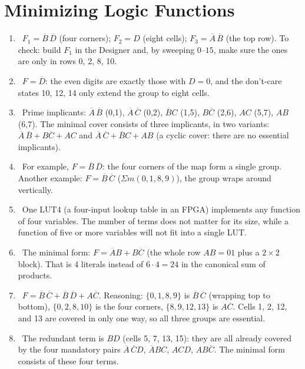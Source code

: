 \section*{Minimizing Logic Functions}
\begin{enumerate}
  \item {}~$F_1=\overline{B}\,\overline{D}$ (four corners); $F_2=D$ (eight cells); $F_3=\overline{A}\,\overline{B}$ (the top row). To check: build $F_1$ in the Designer and, by sweeping $0$--$15$, make sure the ones are only in rows 0, 2, 8, 10.
  \item {}~$F=\overline{D}$: the even digits are exactly those with $D=0$, and the don't-care states 10, 12, 14 only extend the group to eight cells.
  \item {}~Prime implicants: $\overline{A}\,\overline{B}$ (0,1), $\overline{A}\,\overline{C}$ (0,2), $\overline{B}C$ (1,5), $B\overline{C}$ (2,6), $AC$ (5,7), $AB$ (6,7). The minimal cover consists of three implicants, in two variants: $\overline{A}\,\overline{B}+B\overline{C}+AC$ and $\overline{A}\,\overline{C}+\overline{B}C+AB$ (a cyclic cover: there are no essential implicants).
  \item {}~For example, $F=\overline{B}\,\overline{D}$: the four corners of the map form a single group. Another example: $F=\overline{B}\,\overline{C}$ ($\Sigma m(0,1,8,9)$), the group wraps around vertically.
  \item {}~One LUT4 (a four-input lookup table in an FPGA) implements any function of four variables. The number of terms does not matter for its size, while a function of five or more variables will not fit into a single LUT.
  \item {}~The minimal form: $F=\overline{A}B+B\overline{C}$ (the whole row $AB=01$ plus a $2\times2$ block). That is 4 literals instead of $6\cdot4=24$ in the canonical sum of products.
  \item {}~$F=\overline{B}\,\overline{C}+\overline{B}\,\overline{D}+A\overline{C}$. Reasoning: $\{0,1,8,9\}$ is $\overline{B}\,\overline{C}$ (wrapping top to bottom), $\{0,2,8,10\}$ is the four corners, $\{8,9,12,13\}$ is $A\overline{C}$. Cells 1, 2, 12, and 13 are covered in only one way, so all three groups are essential.
  \item {}~The redundant term is $BD$ (cells 5, 7, 13, 15): they are all already covered by the four mandatory pairs $\overline{A}\,\overline{C}D$, $\overline{A}BC$, $ACD$, $AB\overline{C}$. The minimal form consists of these four terms.

\end{enumerate}

